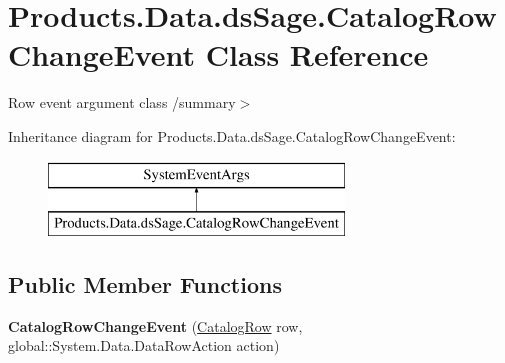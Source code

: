 \hypertarget{class_products_1_1_data_1_1ds_sage_1_1_catalog_row_change_event}{}\section{Products.\+Data.\+ds\+Sage.\+Catalog\+Row\+Change\+Event Class Reference}
\label{class_products_1_1_data_1_1ds_sage_1_1_catalog_row_change_event}


Row event argument class /summary$>$  


Inheritance diagram for Products.\+Data.\+ds\+Sage.\+Catalog\+Row\+Change\+Event\+:\begin{figure}[H]
\begin{center}
\leavevmode
\includegraphics[height=2.000000cm]{class_products_1_1_data_1_1ds_sage_1_1_catalog_row_change_event}
\end{center}
\end{figure}
\subsection*{Public Member Functions}
\begin{DoxyCompactItemize}
\item 
{\bfseries Catalog\+Row\+Change\+Event} (\hyperlink{class_products_1_1_data_1_1ds_sage_1_1_catalog_row}{Catalog\+Row} row, global\+::\+System.\+Data.\+Data\+Row\+Action action)\hypertarget{class_products_1_1_data_1_1ds_sage_1_1_catalog_row_change_event_abb19a0d7e4e26e28beac0cb201eab5e4}{}\label{class_products_1_1_data_1_1ds_sage_1_1_catalog_row_change_event_abb19a0d7e4e26e28beac0cb201eab5e4}

\end{DoxyCompactItemize}
